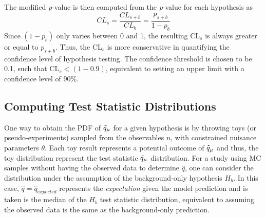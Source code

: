 The modified \textit{p}-value is then computed from the \textit{p}-value for each hypothesis as \cite{asymptotic_test, CLs_Junk, CLs_Read}
\begin{equation}
\label{eq:cls}
    CL_{s} = \frac{CL_{s+b}}{CL_b}= \frac{p_{s+b}}{1-p_b}
\end{equation}
Since $(1 - p_b)$ only varies between 0 and 1, the resulting CL$_s$ is always greater or equal to $p_{s+b}$.
Thus, the CL$_{s}$ is more conservative in quantifying the confidence level of hypothesis testing.
The confidence threshold is chosen to be 0.1, such that CL$_{s} < (1 - 0.9)$, equivalent to setting an upper limit with a confidence level of 90\%.

\subsection{Computing Test Statistic Distributions}

One way to obtain the PDF of $\Tilde{q}_\mu$ for a given hypothesis is by throwing toys (or pseudo-experiments) sampled from the observables $n$, with constrained nuisance parameters $\theta$. 
Each toy result represents a potential outcome of $\Tilde{q}_\mu$ and thus, the toy distribution represent the test statistic $\Tilde{q}_\mu$ distribution.
For a study using MC samples without having the observed data to determine $\hat{q}$, one can consider the distribution under the assumption of the background-only hypothesis $H_b$.
In this case, $\hat{q} = \hat{q}_{expected}$ represents the \textit{expectation} given the model prediction and is taken is the median of the $H_b$ test statistic distribution, equivalent to assuming the observed data is the same as the background-only prediction. 

